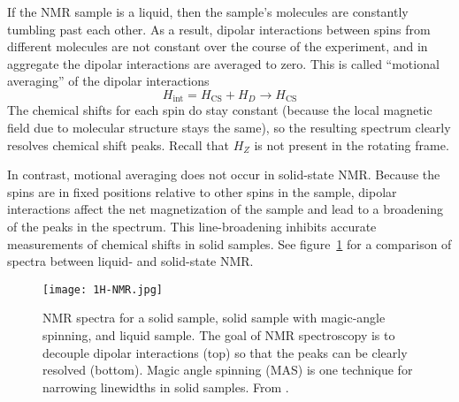 
If the NMR sample is a liquid, then the sample's molecules are constantly tumbling past each other. As a result, dipolar interactions between spins from different molecules are not constant over the course of the experiment, and in aggregate the dipolar interactions are averaged to zero. This is called ``motional averaging'' of the dipolar interactions
\[
H_{\text{int}} = H_\text{CS} + H_D  \longrightarrow H_\text{CS}
\]
The chemical shifts for each spin do stay constant (because the local magnetic field due to molecular structure stays the same), so the resulting spectrum clearly resolves chemical shift peaks. Recall that $H_Z$ is not present in the rotating frame.

In contrast, motional averaging does not occur in solid-state NMR. Because the spins are in fixed positions relative to other spins in the sample, dipolar interactions affect the net magnetization of the sample and lead to a broadening of the peaks in the spectrum. This line-broadening inhibits accurate measurements of chemical shifts in solid samples. See figure~\ref{fig:NMR-averaging} for a comparison of spectra between liquid- and solid-state NMR.

\begin{figure}[H]
    \centering
    \texttt{[image: 1H-NMR.jpg]}
    \caption{NMR spectra for a solid sample, solid sample with magic-angle spinning, and liquid sample. The goal of NMR spectroscopy is to decouple dipolar interactions (top) so that the peaks can be clearly resolved (bottom). Magic angle spinning (MAS) is one technique for narrowing linewidths in solid samples. From \cite{Ottowa-NMR}.}
    \label{fig:NMR-averaging}
\end{figure}





